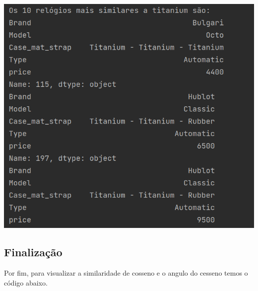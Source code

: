 \documentclass[12pt, a4paper]{article}
\begin{document}
\begin{center}
    \includegraphics[width=14cm]{fig3.png}
\end{center}

\subsection{Finalização}
Por fim, para visualizar a similaridade de cosseno e o angulo do cesseno temos o código abaixo.
\end{document}
